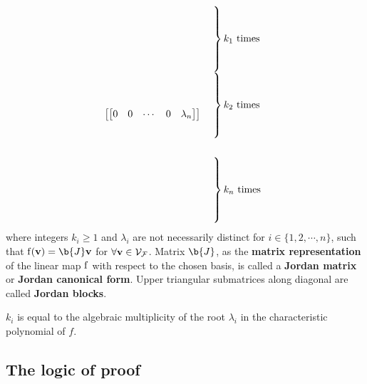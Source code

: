 \begin{theorem}
$$\begin{bmatrix}
\begin{bmatrix}
                    0 &0 &\cdots &0 &\lambda_n
                    \end{bmatrix}
\end{bmatrix}
\begin{array}[c]{@{}l@{\,}l}
    \left.\begin{array}{c} 
    \vphantom{0}  \\ \vphantom{0} \\ \vphantom{\vdots} \\ \vphantom{0} \\ \vphantom{0} 
    \end{array} \right\} & \text{$k_1$ times} \\
    \left. \begin{array}{c}
        \vphantom{0}  \\ \vphantom{0} \\ \vphantom{\vdots} \\ \vphantom{0} \\ \vphantom{0}
    \end{array} \right\} & \text{$k_2$ times} \\
    \vphantom{\vdots} \\
    \left. \begin{array}{c} 
        \vphantom{0}  \\ \vphantom{0} \\ \vphantom{\vdots} \\ \vphantom{0} \\ \vphantom{0}
    \end{array} \right\} & \text{$k_n$ times}
\end{array}
$$
where integers $k_i \geq 1$ and $\lambda_i$ are not necessarily distinct for $i \in \{1,2, \cdots, n\}$, such that $\f(\vv) = \b{J}\vv$ for $\forall \mathbf{v} \in \mathcal{V}_{\mathcal{F}}$.
Matrix $\b{J}$, as the \textbf{matrix representation} of the linear map $\operatorname{f}$ with respect to the chosen basis,  is called a \textbf{Jordan matrix} or \textbf{Jordan canonical form}.
Upper triangular submatrices along diagonal are called \textbf{Jordan blocks}.
\end{theorem}

\begin{remark}
$k_i$ is equal to the algebraic multiplicity of the root $\lambda_i$ in the characteristic polynomial of $f$.
\end{remark}




\subsection{The logic of proof}

